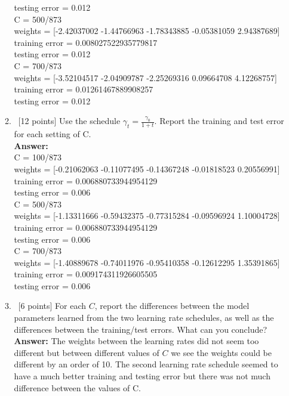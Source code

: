 \documentclass[12pt, fullpage,letterpaper]{article}
\newcommand{\Answer}{{\\\textbf{Answer: }}}
\begin{document}
\begin{enumerate}
\begin{enumerate}
		testing error =  0.012 \\
		C =  500/873 \\
		weights =  [-2.42037002 -1.44766963 -1.78343885 -0.05381059  2.94387689] \\
		training error =  0.008027522935779817 \\
		testing error =  0.012 \\
		C =  700/873 \\
		weights =  [-3.52104517 -2.04909787 -2.25269316  0.09664708  4.12268757] \\
		training error =  0.01261467889908257 \\
		testing error =  0.012 \\
		\item~[12 points] Use the schedule $\gamma_t = \frac{\gamma_0}{1+t}$. Report the training and test error for each setting of C. 
		\Answer\\
		C =  100/873 \\
		weights =  [-0.21062063 -0.11077495 -0.14367248 -0.01818523  0.20556991] \\
		training error =  0.006880733944954129 \\
		testing error =  0.006 \\
		C =  500/873 \\
		weights =  [-1.13311666 -0.59432375 -0.77315284 -0.09596924  1.10004728] \\
		training error =  0.006880733944954129 \\
		testing error =  0.006 \\
		C =  700/873 \\
		weights =  [-1.40889678 -0.74011976 -0.95410358 -0.12612295  1.35391865] \\
		training error =  0.009174311926605505 \\
		testing error =  0.006 \\
		\item~[6 points] For each $C$, report the differences between the model parameters learned from the two learning rate schedules, as well as the differences between the training/test errors. What can you conclude? 
		\Answer The weights between the learning rates did not seem too different but between different values of $C$ we see the weights could be different by an order of 10.  The second learning rate schedule seemed to have a much better training and testing error but there was not much difference between the values of C.
	\end{enumerate}



\end{enumerate}
\end{document}

